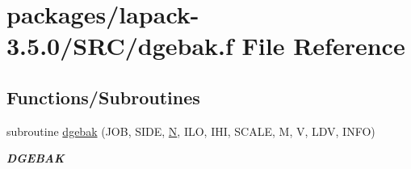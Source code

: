 \hypertarget{dgebak_8f}{}\section{packages/lapack-\/3.5.0/\+S\+R\+C/dgebak.f File Reference}
\label{dgebak_8f}
\subsection*{Functions/\+Subroutines}
\begin{DoxyCompactItemize}
\item 
subroutine \hyperlink{group__doubleGEcomputational_ga486d8da01d3304d595dab4cef3353ce6}{dgebak} (J\+O\+B, S\+I\+D\+E, \hyperlink{polmisc_8c_a0240ac851181b84ac374872dc5434ee4}{N}, I\+L\+O, I\+H\+I, S\+C\+A\+L\+E, M, V, L\+D\+V, I\+N\+F\+O)
\begin{DoxyCompactList}\small\item\em {\bfseries D\+G\+E\+B\+A\+K} \end{DoxyCompactList}\end{DoxyCompactItemize}
